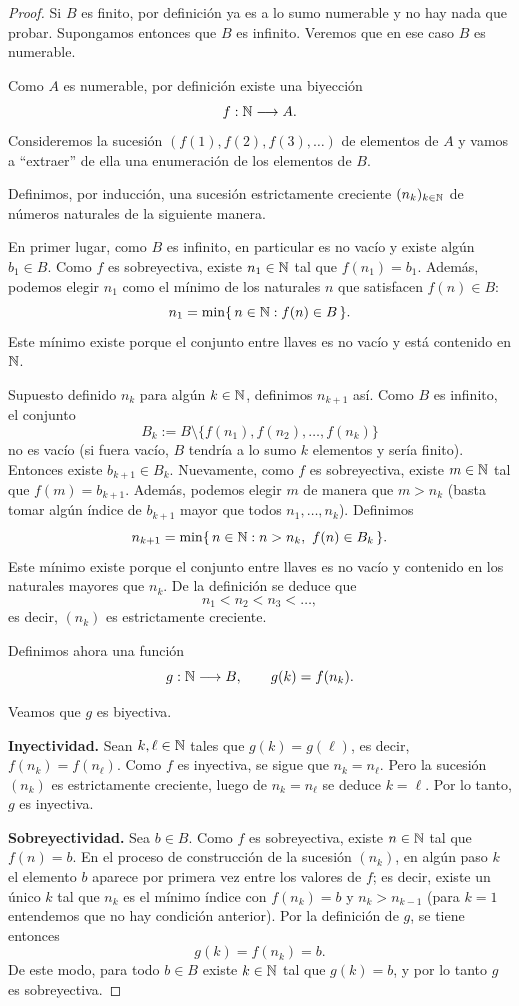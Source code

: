 \begin{proof}
Si $B$ es finito, por definición ya es a lo sumo numerable y no hay nada que
probar. Supongamos entonces que $B$ es infinito. Veremos que en ese caso
$B$ es numerable.

Como $A$ es numerable, por definición existe una biyección
\[
f : \mathbb{N} \longrightarrow A.
\]
Consideremos la sucesión $(f(1), f(2), f(3),\dots)$ de elementos de $A$ y
vamos a “extraer” de ella una enumeración de los elementos de $B$.

Definimos, por inducción, una sucesión estrictamente creciente
$(n_k)_{k\in\mathbb{N}}$ de números naturales de la siguiente manera.

En primer lugar, como $B$ es infinito, en particular es no vacío y existe
algún $b_1 \in B$. Como $f$ es sobreyectiva, existe $n_1 \in \mathbb{N}$ tal que
$f(n_1) = b_1$. Además, podemos elegir $n_1$ como el mínimo de los
naturales $n$ que satisfacen $f(n) \in B$:
\[
n_1 = \min\{\,n \in \mathbb{N} : f(n) \in B\,\}.
\]
Este mínimo existe porque el conjunto entre llaves es no vacío y está
contenido en $\mathbb{N}$.

Supuesto definido $n_k$ para algún $k \in \mathbb{N}$, definimos $n_{k+1}$ así.
Como $B$ es infinito, el conjunto
\[
B_k := B \setminus \{f(n_1), f(n_2), \dots, f(n_k)\}
\]
no es vacío (si fuera vacío, $B$ tendría a lo sumo $k$ elementos y sería
finito). Entonces existe $b_{k+1} \in B_k$. Nuevamente, como $f$ es
sobreyectiva, existe $m \in \mathbb{N}$ tal que $f(m) = b_{k+1}$. Además, podemos
elegir $m$ de manera que $m > n_k$ (basta tomar algún índice de $b_{k+1}$
mayor que todos $n_1,\dots,n_k$). Definimos
\[
n_{k+1} = \min\{\,n \in \mathbb{N} : n > n_k,\ f(n) \in B_k\,\}.
\]
Este mínimo existe porque el conjunto entre llaves es no vacío y contenido
en los naturales mayores que $n_k$. De la definición se deduce que
\[
n_1 < n_2 < n_3 < \dots,
\]
es decir, $(n_k)$ es estrictamente creciente.

Definimos ahora una función
\[
g : \mathbb{N} \longrightarrow B, \qquad g(k) = f(n_k).
\]

Veamos que $g$ es biyectiva.

\medskip

\noindent\textbf{Inyectividad.}
Sean $k,\ell \in \mathbb{N}$ tales que $g(k) = g(\ell)$, es decir,
$f(n_k) = f(n_\ell)$. Como $f$ es inyectiva, se sigue que $n_k = n_\ell$.
Pero la sucesión $(n_k)$ es estrictamente creciente, luego de
$n_k = n_\ell$ se deduce $k = \ell$. Por lo tanto, $g$ es inyectiva.

\medskip

\noindent\textbf{Sobreyectividad.}
Sea $b \in B$. Como $f$ es sobreyectiva, existe $n \in \mathbb{N}$ tal que
$f(n) = b$. En el proceso de construcción de la sucesión $(n_k)$, en algún
paso $k$ el elemento $b$ aparece por primera vez entre los valores de $f$;
es decir, existe un único $k$ tal que $n_k$ es el mínimo índice con
$f(n_k) = b$ y $n_k > n_{k-1}$ (para $k=1$ entendemos que no hay condición
anterior). Por la definición de $g$, se tiene entonces
\[
g(k) = f(n_k) = b.
\]
De este modo, para todo $b \in B$ existe $k \in \mathbb{N}$ tal que $g(k) = b$, y
por lo tanto $g$ es sobreyectiva.


\end{proof}

